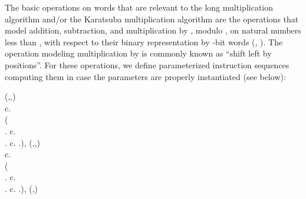 \documentclass{llncs}
\begin{document}
The basic operations on words that are relevant to the long 
multiplication algorithm and/or the Karatsuba multiplication algorithm 
are the operations that model addition, subtraction, and multiplication 
by , modulo , on natural numbers less than , with respect 
to their binary representation by -bit words (, 
).
The operation modeling multiplication by  is commonly known as 
``shift left by  positions''.
For these operations, we define parameterized instruction sequences 
computing them in case the parameters are properly instantiated (see 
below):
\begin{ldispl}
(,,) \deq {} 
\\ \quad
c.\setbr{\False} \conc {}
\\ \quad
{} 
 ( \conc {}   \conc 
   \conc {}   \conc 
                     \conc {}  \conc {} 
\\ \quad {}
  .\setbr{\True} \conc c.\setbr{\False} \conc
    \conc 
   \conc {}   \conc 
      \conc {} \conc {}   \conc {} 
\\ \quad {} 
                     \conc {}   \conc 
  .\setbr{\False} \conc c.\setbr{\True} \conc
    \conc
   \conc
  .\setbr{\True})\;,
\eqnsep
{}(,,) \deq {} 
\\ \quad
c.\setbr{\False} \conc {}
\\ \quad
{} 
 ( \conc {}    \conc 
   \conc {}    \conc 
                     \conc {}   \conc {} 
\\ \quad {}
  .\setbr{\False} \conc c.\setbr{\False} \conc
    \conc 
   \conc {}    \conc 
      \conc {} \conc {}    \conc {} 
\\ \quad {} 
                     \conc {}    \conc 
  .\setbr{\True} \conc c.\setbr{\True}   \conc
    \conc
   \conc
  .\setbr{\False})\;,
\eqnsep
{}(,) \deq {}

\end{ldispl}
\end{document}
